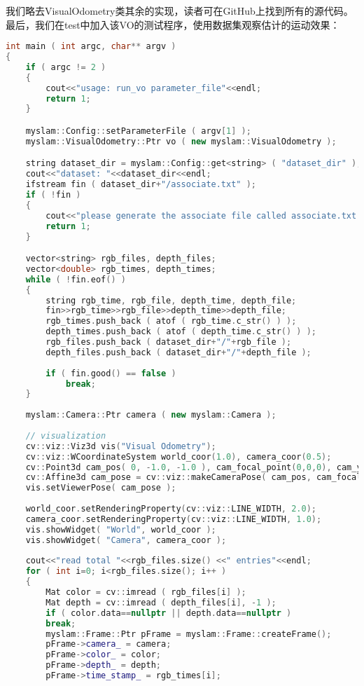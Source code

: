 我们略去VisualOdometry类其余的实现，读者可在GitHub上找到所有的源代码。最后，我们在test中加入该VO的测试程序，使用数据集观察估计的运动效果：

\begin{lstlisting}[language=c++,caption=slambook/project/0.2/test/run\_vo.cpp]
int main ( int argc, char** argv )
{
	if ( argc != 2 )
	{
		cout<<"usage: run_vo parameter_file"<<endl;
		return 1;
	}

	myslam::Config::setParameterFile ( argv[1] );
	myslam::VisualOdometry::Ptr vo ( new myslam::VisualOdometry );

	string dataset_dir = myslam::Config::get<string> ( "dataset_dir" );
	cout<<"dataset: "<<dataset_dir<<endl;
	ifstream fin ( dataset_dir+"/associate.txt" );
	if ( !fin )
	{
		cout<<"please generate the associate file called associate.txt!"<<endl;
		return 1;
	}

	vector<string> rgb_files, depth_files;
	vector<double> rgb_times, depth_times;
	while ( !fin.eof() )
	{
		string rgb_time, rgb_file, depth_time, depth_file;
		fin>>rgb_time>>rgb_file>>depth_time>>depth_file;
		rgb_times.push_back ( atof ( rgb_time.c_str() ) );
		depth_times.push_back ( atof ( depth_time.c_str() ) );
		rgb_files.push_back ( dataset_dir+"/"+rgb_file );
		depth_files.push_back ( dataset_dir+"/"+depth_file );
		
		if ( fin.good() == false )
			break;
	}
	
	myslam::Camera::Ptr camera ( new myslam::Camera );
	
	// visualization
	cv::viz::Viz3d vis("Visual Odometry");
	cv::viz::WCoordinateSystem world_coor(1.0), camera_coor(0.5);
	cv::Point3d cam_pos( 0, -1.0, -1.0 ), cam_focal_point(0,0,0), cam_y_dir(0,1,0);
	cv::Affine3d cam_pose = cv::viz::makeCameraPose( cam_pos, cam_focal_point, cam_y_dir );
	vis.setViewerPose( cam_pose );
	
	world_coor.setRenderingProperty(cv::viz::LINE_WIDTH, 2.0);
	camera_coor.setRenderingProperty(cv::viz::LINE_WIDTH, 1.0);
	vis.showWidget( "World", world_coor );
	vis.showWidget( "Camera", camera_coor );
	
	cout<<"read total "<<rgb_files.size() <<" entries"<<endl;
	for ( int i=0; i<rgb_files.size(); i++ )
	{
		Mat color = cv::imread ( rgb_files[i] );
		Mat depth = cv::imread ( depth_files[i], -1 );
		if ( color.data==nullptr || depth.data==nullptr )
		break;
		myslam::Frame::Ptr pFrame = myslam::Frame::createFrame();
		pFrame->camera_ = camera;
		pFrame->color_ = color;
		pFrame->depth_ = depth;
		pFrame->time_stamp_ = rgb_times[i];
		

\end{lstlisting}
